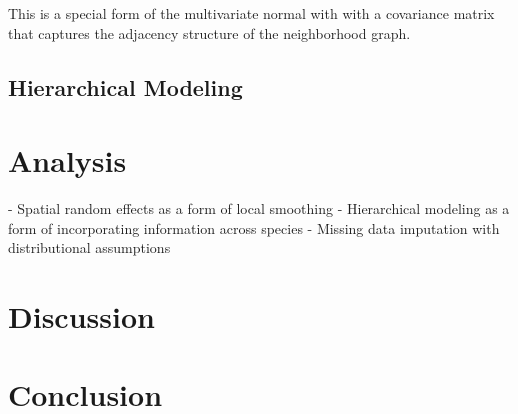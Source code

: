 \documentclass[notitlepage]{article}
\begin{document}
This is a special form of the multivariate normal with with a covariance matrix that captures the adjacency structure of the neighborhood graph.

\subsection{Hierarchical Modeling}

\section{Analysis}

- Spatial random effects as a form of local smoothing
- Hierarchical modeling as a form of incorporating information across species
- Missing data imputation with distributional assumptions

\section{Discussion}

\section{Conclusion}

\printbibliography
\end{document}
